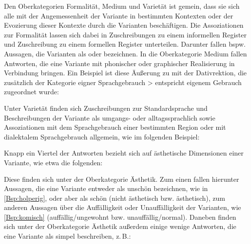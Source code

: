 Den Oberkategorien \glqq Formalität\grqq, \glqq Medium\grqq{} und \glqq Varietät\grqq{} ist gemein, dass sie sich alle mit der Angemessenheit der Variante in bestimmten Kontexten oder der Evozierung dieser Kontexte durch die Varianten beschäftigen. 
Die Assoziationen zur Formalität lassen sich dabei in Zuschreibungen zu einem informellen Register und Zuschreibung zu einem formellen Register unterteilen. 
Darunter fallen bspw. Aussagen, die Varianten als  oder  bezeichnen. 
In die Oberkategorie \glqq Medium\grqq{} fallen Antworten, die eine Variante mit phonischer oder graphischer Realisierung in Verbindung bringen. Ein Beispiel ist diese Äußerung zu \dank{} mit der Dativrektion, die zusätzlich der Kategorie \glqq eigner Sprachgebrauch > entspricht eigenem Gebrauch\grqq{} zugeordnet wurde: 
\begin{exe}
\ex {}
\end{exe}
Unter \glqq Varietät\grqq{} finden sich Zuschreibungen zur Standardsprache und Beschreibungen der Variante als umgangs- oder alltagssprachlich sowie Assoziationen mit dem Sprachgebrauch einer bestimmten Region oder mit dialektalem Sprachgebrauch allgemein, wie im folgenden Beispiel:
\begin{exe}
\ex {}
\end{exe}
Knapp ein Viertel der Antworten bezieht sich auf ästhetische Dimensionen einer Variante, wie etwa die folgenden: 
\begin{exe}
\ex {} \label{Bsp:holperig}
\ex {} \label{Bsp:komisch}
\end{exe}
Diese finden sich unter der Oberkategorie \glqq Ästhetik\grqq. 
Zum einen fallen hierunter Aussagen, die eine Variante entweder als unschön bezeichnen, wie in \autoref{Bsp:holperig}, oder aber als schön (\glqq nicht ästhetisch\grqq{} bzw. \glqq ästhetisch\grqq), zum anderen Aussagen über die Auffälligkeit oder Unauffälligkeit der Varianten, wie \autoref{Bsp:komisch} (\glqq auffällig/ungewohnt\grqq{} bzw. \glqq unauffällig/normal\grqq). 
Daneben finden sich unter der Oberkategorie \glqq Ästhetik\grqq{} außerdem einige wenige Antworten, die eine Variante als \glqq simpel\grqq{} beschreiben, z.\,B.:
\begin{exe}
\ex {} 
\end{exe}

